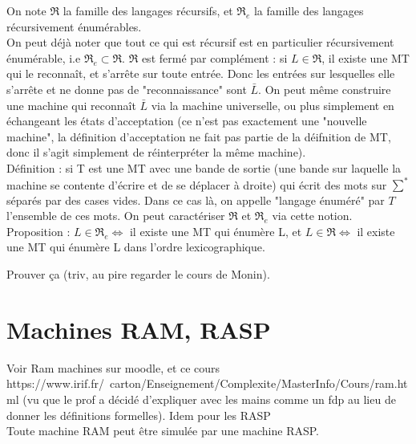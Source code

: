 \documentclass{article}
\begin{document}
On note $\mathfrak{R}$ la famille des langages récursifs, et $\mathfrak{R}_e$ la famille des langages récursivement énumérables. \\ 

On peut déjà noter que tout ce qui est récursif est en particulier récursivement énumérable, i.e $\mathfrak{R}_e \subset \mathfrak{R} $. $\mathfrak{R}$ est fermé par complément : si $L \in \mathfrak{R} $, il existe une MT qui le reconnaît, et s'arrête sur toute entrée. Donc les entrées sur lesquelles elle s'arrête et ne donne pas de "reconnaissance" sont $\bar{L}$. On peut même construire une machine qui reconnaît $\bar{L}$ via la machine universelle, ou plus simplement en échangeant les états d'acceptation (ce n'est pas exactement une "nouvelle machine", la définition d'acceptation ne fait pas partie de la déifnition de MT, donc il s'agit simplement de réinterpréter la même machine). \\

Définition : si T est une MT avec une bande de sortie (une bande sur laquelle la machine se contente d'écrire et de se déplacer à droite) qui écrit des mots sur $\sum^*$ séparés par des cases vides. Dans ce cas là, on appelle "langage énuméré" par $T$ l'ensemble de ces mots. On peut caractériser $\mathfrak{R}$ et $\mathfrak{R}_e$ via cette notion. \\

Proposition : $L \in \mathfrak{R}_e \Leftrightarrow $ il existe une MT qui énumère L, et $L \in \mathfrak{R} \Leftrightarrow $ il existe une MT qui énumère L dans l'ordre lexicographique. 

 Prouver ça (triv, au pire regarder le cours de Monin). 

\section{Machines RAM, RASP}

 Voir Ram machines sur moodle, et ce cours https://www.irif.fr/~carton/Enseignement/Complexite/MasterInfo/Cours/ram.html (vu que le prof a décidé d'expliquer avec les mains comme un fdp au lieu de donner les définitions formelles). Idem pour les RASP \\
 Toute machine RAM peut être simulée par une machine RASP. 
 
\end{document}

